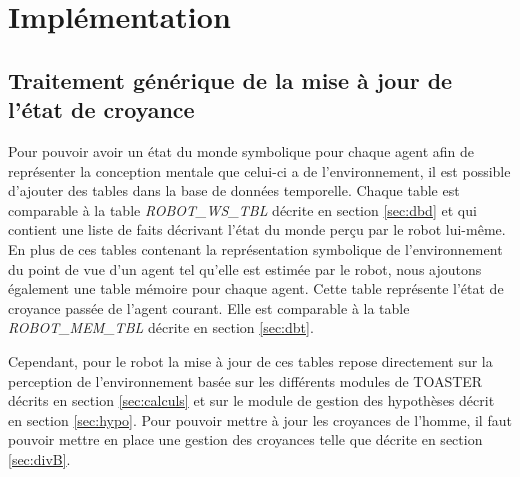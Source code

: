 \documentclass[a4paper,11pt,twoside]{StyleThese}
\begin{document}



\section{Implémentation}

\subsection{Traitement générique de la mise à jour de l'état de croyance}
\label{sec:dbPt}
Pour pouvoir avoir un état du monde symbolique pour chaque agent afin de représenter la conception mentale que celui-ci a de l'environnement, il est possible d'ajouter des tables dans la base de données temporelle.
Chaque table est comparable à la table \textit{ROBOT\_WS\_TBL} décrite en section \ref{sec:dbd} et qui contient une liste de faits décrivant l'état du monde perçu par le robot lui-même.
En plus de ces tables contenant la représentation symbolique de l'environnement du point de vue d'un agent tel qu'elle est estimée par le robot, nous ajoutons également une table mémoire pour chaque agent. Cette table représente l'état de croyance passée de l'agent courant. Elle est comparable à la table \textit{ROBOT\_MEM\_TBL} décrite en section \ref{sec:dbt}.

Cependant, pour le robot la mise à jour de ces tables repose directement sur la perception de l'environnement basée sur les différents modules de TOASTER décrits en section \ref{sec:calculs} et sur le module de gestion des hypothèses décrit en section \ref{sec:hypo}. Pour pouvoir mettre à jour les croyances de l'homme, il faut pouvoir mettre en place une gestion des croyances telle que décrite en section \ref{sec:divB}.
\end{document}
